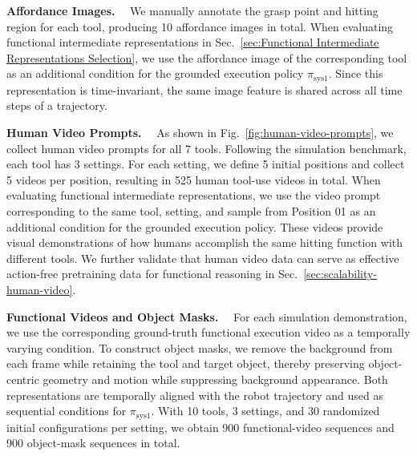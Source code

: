 \textbf{Affordance Images.}~~ 
We manually annotate the grasp point and hitting region for each tool, producing 10 affordance images in total. When evaluating functional intermediate representations in Sec.~\ref{sec:Functional Intermediate Representations Selection}, we use the affordance image of the corresponding tool as an additional condition for the grounded execution policy $\pi_{\mathrm{sys1}}$. Since this representation is time-invariant, the same image feature is shared across all time steps of a trajectory.





\textbf{Human Video Prompts.}~~
As shown in Fig.~\ref{fig:human-video-prompts}, we collect human video prompts for all 7 tools. Following the simulation benchmark, each tool has 3 settings. For each setting, we define 5 initial positions and collect 5 videos per position, resulting in 525 human tool-use videos in total. When evaluating functional intermediate representations, we use the video prompt corresponding to the same tool, setting, and sample from Position 01 as an additional condition for the grounded execution policy. These videos provide visual demonstrations of how humans accomplish the same hitting function with different tools. We further validate that human video data can serve as effective action-free pretraining data for functional reasoning in Sec.~\ref{sec:scalability-human-video}.


\textbf{Functional Videos and Object Masks.}~~
For each simulation demonstration, we use the corresponding ground-truth functional execution video as a temporally varying condition.
To construct object masks, we remove the background from each frame while retaining the tool and target object, thereby preserving object-centric geometry and motion while suppressing background appearance.
Both representations are temporally aligned with the robot trajectory and used as sequential conditions for $\pi_{\mathrm{sys1}}$.
With 10 tools, 3 settings, and 30 randomized initial configurations per setting, we obtain 900 functional-video sequences and 900 object-mask sequences in total.

